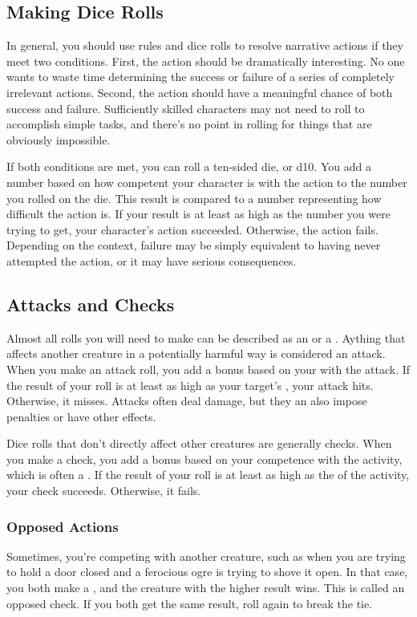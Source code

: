     \subsection{Making Dice Rolls}
        In general, you should use rules and dice rolls to resolve narrative actions if they meet two conditions.
        First, the action should be dramatically interesting.
        No one wants to waste time determining the success or failure of a series of completely irrelevant actions.
        Second, the action should have a meaningful chance of both success and failure.
        Sufficiently skilled characters may not need to roll to accomplish simple tasks, and there's no point in rolling for things that are obviously impossible.

        If both conditions are met, you can roll a ten-sided die, or d10.
        You add a number based on how competent your character is with the action to the number you rolled on the die.
        This result is compared to a number representing how difficult the action is.
        If your result is at least as high as the number you were trying to get, your character's action succeeded.
        Otherwise, the action fails.
        Depending on the context, failure may be simply equivalent to having never attempted the action, or it may have serious consequences.

    \subsection{Attacks and Checks}
        Almost all rolls you will need to make can be described as an  or a .
        Aything that affects another creature in a potentially harmful way is considered an attack.
        When you make an attack roll, you add a bonus based on your  with the attack.
        If the result of your roll is at least as high as your target's , your attack hits.
        Otherwise, it misses.
        Attacks often deal damage, but they an also impose penalties or have other effects.

        Dice rolls that don't directly affect other creatures are generally checks.
        When you make a check, you add a bonus based on your competence with the activity, which is often a .
        If the result of your roll is at least as high as the  of the activity, your check succeeds.
        Otherwise, it fails.

        \subsubsection{Opposed Actions}
            Sometimes, you're competing with another creature, such as when you are trying to hold a door closed and a ferocious ogre is trying to shove it open.
            In that case, you both make a , and the creature with the higher result wins.
            This is called an opposed check.
            If you both get the same result, roll again to break the tie.

